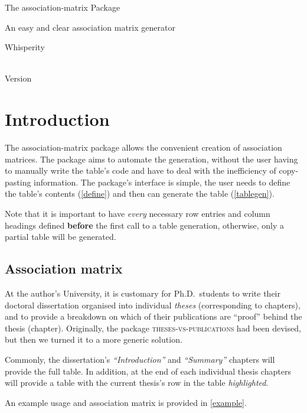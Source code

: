\documentclass{article}
\begin{document}
\vspace*{0in}
\begin{center}
    \LARGE The \textsf{association-matrix} Package \\
    \small \rule{0in}{1em} An easy and clear association matrix generator \\
    \large \rule{0in}{2em} Whisperity \\
    \rule{0em}{2em}\amxDate \\
    Version \amxVersion
\end{center}

\tableofcontents


\section{Introduction}\label{intro}
The \textsf{association-matrix} package allows the convenient creation of association matrices.
The package aims to automate the generation, without the user having to manually write the table's code and have to deal with the inefficiency of copy-pasting information.
The package's interface is simple, the user needs to define the table's contents (\cref{define}) and then can generate the table (\cref{tablegen}).

Note that it is important to have \emph{every} necessary row entries and column headings defined \textbf{before} the first call to a table generation, otherwise, only a partial table will be generated.

\subsection{Association matrix}\label{association-mx}
At the author's University, it is customary for Ph.D.\ students to write their doctoral dissertation organised into individual \emph{theses} (corresponding to chapters), and to provide a breakdown on which of their publications are ``proof'' behind the thesis (chapter).
Originally, the package \textsc{theses-vs-publications} had been devised, but then we turned it to a more generic solution.

Commonly, the dissertation's \emph{``Introduction''} and \emph{``Summary''} chapters will provide the full table.
In addition, at the end of each individual thesis chapters will provide a table with the current thesis's row in the table \emph{highlighted}.

An example usage and association matrix is provided in \cref{example}.
\end{document}
